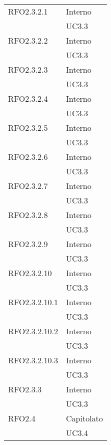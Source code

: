 \begin{center}
\begin{longtable}{ | >{\centering\arraybackslash}m{5cm} | >{\centering\arraybackslash}m{5cm} | }
        RFO2.3.2.1 & Interno\\
            & UC3.3 \\
\hline

        RFO2.3.2.2 & Interno\\
            & UC3.3 \\
\hline

        RFO2.3.2.3 & Interno\\
            & UC3.3 \\
\hline

        RFO2.3.2.4 & Interno\\
            & UC3.3 \\
\hline

        RFO2.3.2.5 & Interno\\
            & UC3.3 \\
\hline

        RFO2.3.2.6 & Interno\\
            & UC3.3 \\
\hline

        RFO2.3.2.7 & Interno\\
            & UC3.3 \\
\hline

        RFO2.3.2.8 & Interno\\
            & UC3.3 \\
\hline

        RFO2.3.2.9 & Interno\\
            & UC3.3 \\
\hline

        RFO2.3.2.10 & Interno\\
            & UC3.3 \\
\hline

        RFO2.3.2.10.1 & Interno\\
            & UC3.3 \\
\hline

        RFO2.3.2.10.2 & Interno\\
            & UC3.3 \\
\hline

        RFO2.3.2.10.3 & Interno\\
            & UC3.3 \\
\hline

        RFO2.3.3 & Interno\\
            & UC3.3 \\
\hline

        RFO2.4 & Capitolato\\
            & UC3.4 \\
\hline


\end{longtable}
\end{center}
